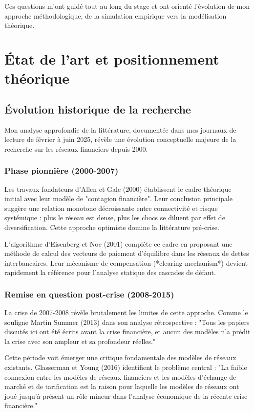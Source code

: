\documentclass[12pt,a4paper,twoside]{article}
\begin{document}
Ces questions m'ont guidé tout au long du stage et ont orienté l'évolution de mon approche méthodologique, de la simulation empirique vers la modélisation théorique.

\section{État de l'art et positionnement théorique}

\subsection{Évolution historique de la recherche}

Mon analyse approfondie de la littérature, documentée dans mes journaux de lecture de février à juin 2025, révèle une évolution conceptuelle majeure de la recherche sur les réseaux financiers depuis 2000.

\subsubsection{Phase pionnière (2000-2007)}

Les travaux fondateurs d'Allen et Gale (2000) établissent le cadre théorique initial avec leur modèle de "contagion financière". Leur conclusion principale suggère une relation monotone décroissante entre connectivité et risque systémique : plus le réseau est dense, plus les chocs se diluent par effet de diversification. Cette approche optimiste domine la littérature pré-crise.

L'algorithme d'Eisenberg et Noe (2001) complète ce cadre en proposant une méthode de calcul des vecteurs de paiement d'équilibre dans les réseaux de dettes interbancaires. Leur mécanisme de compensation (*clearing mechanism*) devient rapidement la référence pour l'analyse statique des cascades de défaut.

\subsubsection{Remise en question post-crise (2008-2015)}

La crise de 2007-2008 révèle brutalement les limites de cette approche. Comme le souligne Martin Summer (2013) dans son analyse rétrospective : "Tous les papiers discutés ici ont été écrits avant la crise financière, et aucun des modèles n'a prédit la crise avec son ampleur et sa profondeur réelles."

Cette période voit émerger une critique fondamentale des modèles de réseaux existants. Glasserman et Young (2016) identifient le problème central : "La faible connexion entre les modèles de réseaux financiers et les modèles d'échange de marché et de tarification est la raison pour laquelle les modèles de réseaux ont joué jusqu'à présent un rôle mineur dans l'analyse économique de la récente crise financière."
\end{document}
